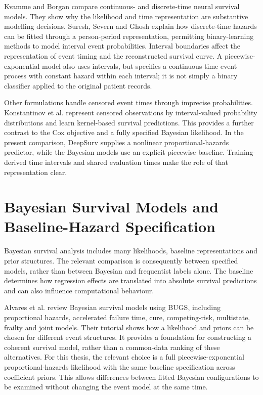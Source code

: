 Kvamme and Borgan \cite{ref21} compare continuous- and discrete-time neural survival models. They show why the likelihood and time representation are substantive modelling decisions. Suresh, Severn and Ghosh \cite{ref46} explain how discrete-time hazards can be fitted through a person-period representation, permitting binary-learning methods to model interval event probabilities. Interval boundaries affect the representation of event timing and the reconstructed survival curve. A piecewise-exponential model also uses intervals, but specifies a continuous-time event process with constant hazard within each interval; it is not simply a binary classifier applied to the original patient records.

Other formulations handle censored event times through imprecise probabilities. Konstantinov et al. \cite{ref50} represent censored observations by interval-valued probability distributions and learn kernel-based survival predictions. This provides a further contrast to the Cox objective and a fully specified Bayesian likelihood. In the present comparison, DeepSurv supplies a nonlinear proportional-hazards predictor, while the Bayesian models use an explicit piecewise baseline. Training-derived time intervals and shared evaluation times make the role of that representation clear.

\section{Bayesian Survival Models and Baseline-Hazard Specification}\label{bayesian-survival-models-and-baseline-hazard-specification}

Bayesian survival analysis includes many likelihoods, baseline representations and prior structures. The relevant comparison is consequently between specified models, rather than between Bayesian and frequentist labels alone. The baseline determines how regression effects are translated into absolute survival predictions and can also influence computational behaviour.

Alvares et al. \cite{ref22} review Bayesian survival models using BUGS, including proportional hazards, accelerated failure time, cure, competing-risk, multistate, frailty and joint models. Their tutorial shows how a likelihood and priors can be chosen for different event structures. It provides a foundation for constructing a coherent survival model, rather than a common-data ranking of these alternatives. For this thesis, the relevant choice is a full piecewise-exponential proportional-hazards likelihood with the same baseline specification across coefficient priors. This allows differences between fitted Bayesian configurations to be examined without changing the event model at the same time.

